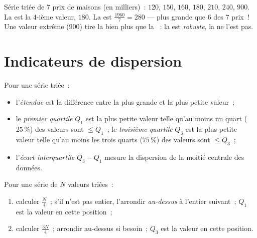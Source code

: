 \begin{example}\label{ex:g10:stats:median}
Série triée de $7$ prix de maisons (en milliers)~: $120$, $150$, $160$,
$180$, $210$, $240$, $900$. La  est la $4$-ième valeur, $180$. La
 est $\frac{1960}{7} = 280$ --- plus grande que $6$ des $7$
prix~! Une valeur extrême ($900$) tire la  bien plus que la
~: la  est \emph{robuste}, la  ne l'est pas.
\end{example}

\section{Indicateurs de dispersion}

\begin{definition}\label{def:g10:stats:quartiles}
Pour une série triée~:
\begin{itemize}
  \item l'\emph{étendue} est la différence entre la plus
        grande et la plus petite valeur~;
  \item le \emph{premier quartile} $Q_1$ est la plus
        petite valeur telle qu'au moins un quart ($25\,\%$) des valeurs
        sont $\leq Q_1$~; le \emph{troisième quartile} $Q_3$ est la plus
        petite valeur telle qu'au moins les trois quarts ($75\,\%$) des
        valeurs sont $\leq Q_3$~;
  \item l'\emph{écart interquartile} $Q_3 - Q_1$ mesure la dispersion de
        la moitié centrale des données.
\end{itemize}
\end{definition}

\begin{method}\label{met:g10:stats:quartiles}
Pour une série de $N$ valeurs triées~:
\begin{enumerate}
  \item calculer $\frac N4$~; s'il n'est pas entier, l'arrondir
        \emph{au-dessus} à l'entier suivant~; $Q_1$ est la valeur en
        cette position~;
  \item calculer $\frac{3N}{4}$~; arrondir au-dessus si besoin~; $Q_3$
        est la valeur en cette position.
\end{enumerate}
\end{method}

